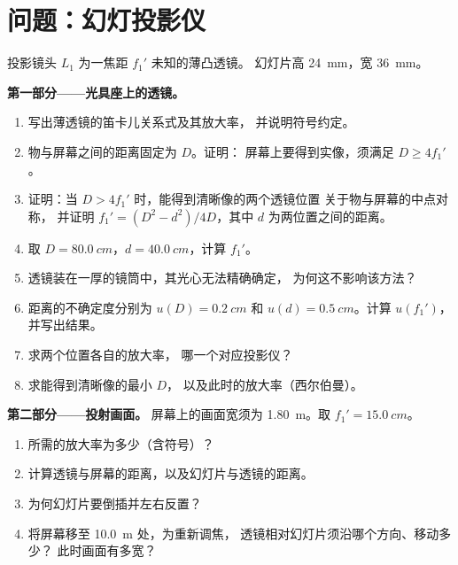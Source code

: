 \section{问题：幻灯投影仪}

\begin{problem}
\label{pb:b1:mirrors-thin-lenses:1}
投影镜头 $L_1$ 为一焦距 $f_1'$ 未知的薄凸透镜。
幻灯片高 \qty{24}{mm}，宽 \qty{36}{mm}。

\medskip
\noindent\textbf{第一部分——光具座上的透镜。}
\begin{enumerate}
  \item 写出薄透镜的笛卡儿关系式及其放大率，
        并说明符号约定。
  \item 物与屏幕之间的距离固定为 $D$。证明：
        屏幕上要得到实像，须满足 $D \geq 4f_1'$。
  \item 证明：当 $D > 4f_1'$ 时，能得到清晰像的两个透镜位置
        关于物与屏幕的中点对称，
        并证明 $f_1' = (D^2 - d^2)/4D$，其中 $d$
        为两位置之间的距离。
  \item 取 $D = \qty{80.0}{cm}$，$d = \qty{40.0}{cm}$，计算
        $f_1'$。
  \item 透镜装在一厚的镜筒中，其光心无法精确确定，
        为何这不影响该方法？
  \item 距离的不确定度分别为 $u(D) = \qty{0.2}{cm}$ 和
        $u(d) = \qty{0.5}{cm}$。计算 $u(f_1')$，并写出结果。
  \item 求两个位置各自的放大率，
        哪一个对应投影仪？
  \item 求能得到清晰像的最小 $D$，
        以及此时的放大率（西尔伯曼）。
\end{enumerate}

\medskip
\noindent\textbf{第二部分——投射画面。}
屏幕上的画面宽须为 \qty{1.80}{m}。取
$f_1' = \qty{15.0}{cm}$。
\begin{enumerate}[resume]
  \item 所需的放大率为多少（含符号）？
  \item 计算透镜与屏幕的距离，以及幻灯片与透镜的距离。
  \item 为何幻灯片要倒插并左右反置？
  \item 将屏幕移至 \qty{10.0}{m} 处，为重新调焦，
        透镜相对幻灯片须沿哪个方向、移动多少？
        此时画面有多宽？
\end{enumerate}


\end{problem}
